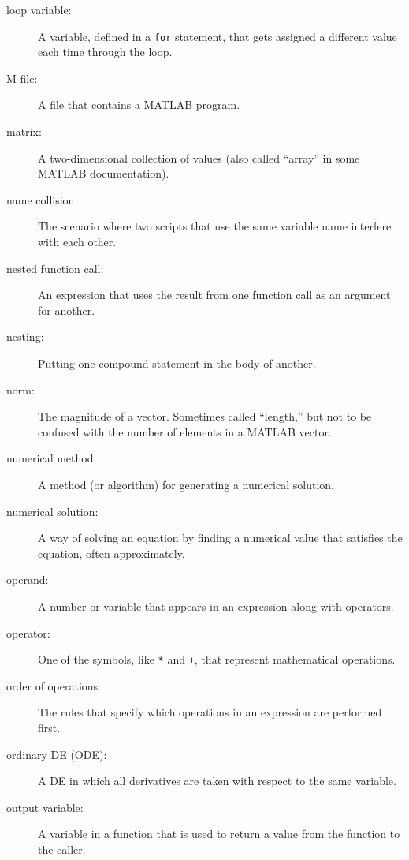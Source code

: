 \begin{description}
\item[loop variable:] A variable, defined in a {\tt for} statement,
that gets assigned a different value each time through the loop.

\item[M-file:] A file that contains a MATLAB program.

\item[matrix:] A two-dimensional collection of values (also called
``array'' in some MATLAB documentation).

\item[name collision:] The scenario where two scripts that use the
same variable name interfere with each other.

\item[nested function call:] An expression that uses the result from
one function call as an argument for another.

\item[nesting:] Putting one compound statement in the body of another.

\item[norm:] The magnitude of a vector.  Sometimes called ``length,''
but not to be confused with the number of elements in a MATLAB
vector.

\item[numerical method:] A method (or algorithm) for generating
a numerical solution.

\item[numerical solution:] A way of solving an equation by finding
a numerical value that satisfies the equation, often approximately.

\item[operand:] A number or variable that appears in an expression along
with operators.

\item[operator:] One of the symbols, like \lstinline{*} and \lstinline{+}, that
represent mathematical operations.

\item[order of operations:] The rules that specify which operations
in an expression are performed first.

\item[ordinary DE (ODE):] A DE in which all derivatives are taken with
respect to the same variable.

\item[output variable:] A variable in a function that is used to
return a value from the function to the caller.


\end{description}

